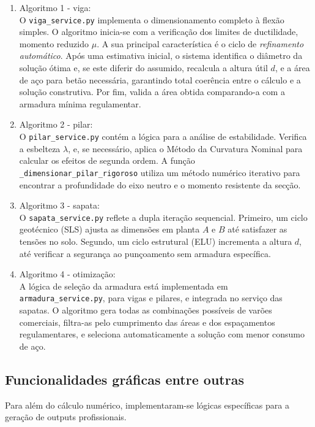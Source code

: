 \begin{enumerate}
    \item Algoritmo 1 - viga:\\
    O \texttt{viga\_service.py} implementa o dimensionamento completo à flexão simples. O algoritmo inicia-se com a verificação dos limites de ductilidade, momento reduzido $\mu$. A sua principal característica é o ciclo de \textit{refinamento automático}. Após uma estimativa inicial, o sistema identifica o diâmetro da solução ótima e, se este diferir do assumido, recalcula a altura útil $d$, e a área de aço para betão necessária, garantindo total coerência entre o cálculo e a solução construtiva. Por fim, valida a área obtida comparando-a com a armadura mínima regulamentar.

    \item Algoritmo 2 - pilar:\\
    O \texttt{pilar\_service.py} contém a lógica para a análise de estabilidade. Verifica a esbelteza $\lambda$, e, se necessário, aplica o Método da Curvatura Nominal para calcular os efeitos de segunda ordem. A função \texttt{\_dimensionar\_pilar\_rigoroso} utiliza um método numérico iterativo para encontrar a profundidade do eixo neutro e o momento resistente da secção.

    \item Algoritmo 3 - sapata:\\
    O \texttt{sapata\_service.py} reflete a dupla iteração sequencial.
    Primeiro, um ciclo geotécnico (SLS) ajusta as dimensões em planta $A$ e $B$ até satisfazer as tensões no solo. Segundo, um ciclo estrutural (ELU) incrementa a altura $d$, até verificar a segurança ao punçoamento sem armadura específica.

    \item Algoritmo 4 - otimização:\\
    A lógica de seleção da armadura está implementada em \texttt{armadura\_service.py}, para vigas e pilares, e integrada no serviço das sapatas. O algoritmo gera todas as combinações possíveis de varões comerciais, filtra-as pelo cumprimento das áreas e dos espaçamentos regulamentares, e seleciona automaticamente a solução com menor consumo de aço.
\end{enumerate}

\subsection{Funcionalidades gráficas entre outras}
Para além do cálculo numérico, implementaram-se lógicas específicas para a geração de outputs profissionais.

